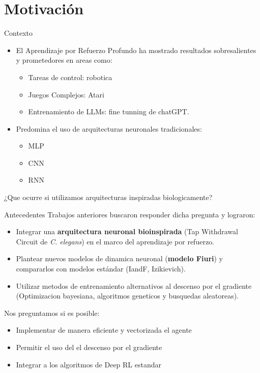 \section{Motivación}

\begin{frame}{Contexto}

  \begin{itemize}
    \item El Aprendizaje por Refuerzo Profundo ha mostrado resultados sobresalientes y prometedores en areas como:
          \begin{itemize}
            \item Tareas de control: robotica
            \item Juegos Complejos: Atari
            \item Entrenamiento de LLMs: fine tunning de chatGPT.
          \end{itemize}
    \item Predomina el uso de arquitecturas neuronales tradicionales:
          \begin{itemize}
            \item MLP
            \item CNN
            \item RNN
          \end{itemize}
  \end{itemize}

  \begin{block}{}
    ¿Que ocurre si utilizamos arquitecturas inspiradas biologicamente?
  \end{block}
\end{frame}

\begin{frame}{Antecedentes}  
  Trabajos anteriores buscaron responder dicha pregunta y lograron:
  \begin{itemize}
      \item Integrar una \textbf{arquitectura neuronal bioinspirada} (Tap Withdrawal Circuit de \textit{C. elegans}) en el marco del aprendizaje por refuerzo.
      \item Plantear nuevos modelos de dinamica neuronal (\textbf{modelo Fiuri}) y compararlos con modelos estándar (IandF, Izikievich).
      \item Utilizar metodos de entrenamiento alternativos al descenso por el gradiente (Optimizacion bayesiana, algoritmos geneticos y busquedas aleatoreas).
  \end{itemize}
  
  Nos preguntamos si es posible:
  \begin{itemize}
    \item Implementar de manera eficiente y vectorizada el agente
    \item Permitir el uso del el descenso por el gradiente
    \item Integrar a los algoritmos de Deep RL estandar
  \end{itemize}
\end{frame}

